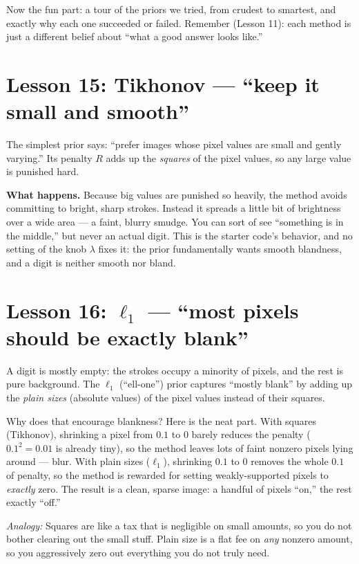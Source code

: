 \documentclass[11pt]{article}
\newcommand{\analogy}[1]{\par\smallskip\noindent\textit{Analogy:} #1\par\smallskip}
\begin{document}
Now the fun part: a tour of the priors we tried, from crudest to smartest,
and exactly why each one succeeded or failed. Remember (Lesson 11): each
method is just a different belief about ``what a good answer looks like.''

\section{Lesson 15: Tikhonov --- ``keep it small and smooth''}

The simplest prior says: ``prefer images whose pixel values are small and
gently varying.'' Its penalty $R$ adds up the \emph{squares} of the pixel
values, so any large value is punished hard.

\textbf{What happens.} Because big values are punished so heavily, the method
avoids committing to bright, sharp strokes. Instead it spreads a little bit of
brightness over a wide area --- a faint, blurry smudge. You can sort of see
``something is in the middle,'' but never an actual digit. This is the starter
code's behavior, and no setting of the knob $\lambda$ fixes it: the prior
fundamentally wants smooth blandness, and a digit is neither smooth nor bland.

\section{Lesson 16: $\ell_1$ --- ``most pixels should be exactly blank''}

A digit is mostly empty: the strokes occupy a minority of pixels, and the rest
is pure background. The $\ell_1$ (``ell-one'') prior captures ``mostly blank''
by adding up the \emph{plain sizes} (absolute values) of the pixel values
instead of their squares.

Why does that encourage blankness? Here is the neat part. With squares
(Tikhonov), shrinking a pixel from $0.1$ to $0$ barely reduces the penalty
($0.1^2 = 0.01$ is already tiny), so the method leaves lots of faint nonzero
pixels lying around --- blur. With plain sizes ($\ell_1$), shrinking $0.1$ to
$0$ removes the whole $0.1$ of penalty, so the method is rewarded for setting
weakly-supported pixels to \emph{exactly} zero. The result is a clean,
sparse image: a handful of pixels ``on,'' the rest exactly ``off.''

\analogy{Squares are like a tax that is negligible on small amounts, so you
do not bother clearing out the small stuff. Plain size is a flat fee on
\emph{any} nonzero amount, so you aggressively zero out everything you do not
truly need.}
\end{document}
